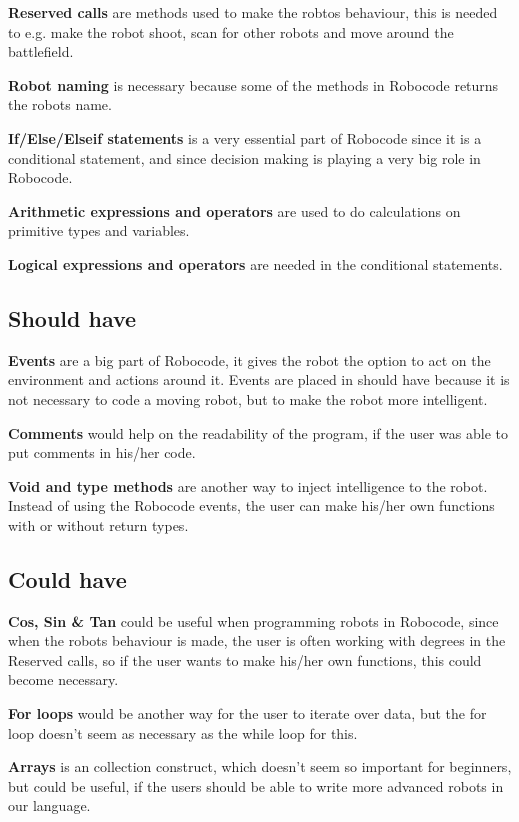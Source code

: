 \textbf{Reserved calls} are methods used to make the robtos behaviour, this is needed to e.g. make the robot shoot, scan for other robots and move around the battlefield. 

\textbf{Robot naming} is necessary because some of the methods in Robocode returns the robots name. 

\textbf{If/Else/Elseif statements} is a very essential part of Robocode since it is a conditional statement, and since decision making is playing a very big role in Robocode.

\textbf{Arithmetic expressions and operators} are used to do calculations on primitive types and variables. 

\textbf{Logical expressions and operators} are needed in the conditional statements.

\subsection{Should have}
\textbf{Events} are a big part of Robocode, it gives the robot the option to act on the environment and actions around it. Events are placed in should have because it is not necessary to code a moving robot, but to make the robot more intelligent.

\textbf{Comments} would help on the readability of the program, if the user was able to put comments in his/her code. 

\textbf{Void and type methods} are another way to inject intelligence to the robot. Instead of using the Robocode events, the user can make his/her own functions with or without return types. 

\subsection{Could have} 
\textbf{Cos, Sin \& Tan} could be useful when programming robots in Robocode, since when the robots behaviour is made, the user is often working with degrees in the Reserved calls, so if the user wants to make his/her own functions, this could become necessary.

\textbf{For loops} would be another way for the user to iterate over data, but the for loop doesn't seem as necessary as the while loop for this.
 
\textbf{Arrays} is an collection construct, which doesn't seem so important for beginners, but could be useful, if the users should be able to write more advanced robots in our language. 

